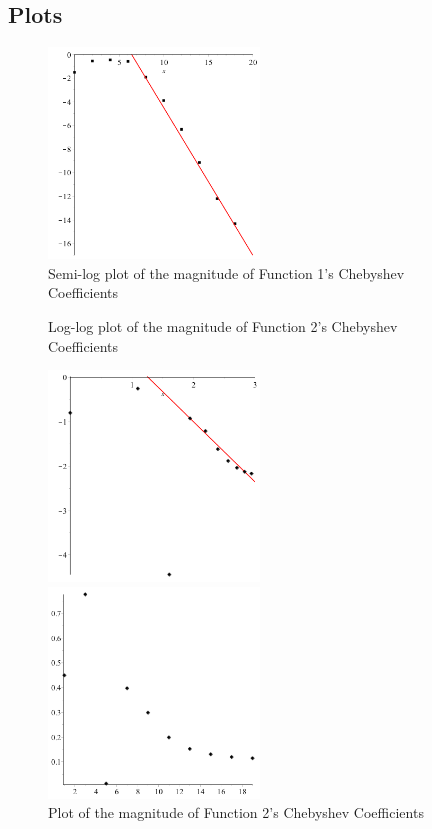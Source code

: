 \documentclass[11pt]{article} %
\begin{document}
{\subsection*{Plots}
\begin{figure}[H]
\caption*{Semi-log plot of the magnitude of Function 1's Chebyshev Coefficients}
\includegraphics[width=0.5\textwidth]{plots/problem6plot1.png}
\end{figure}
\begin{figure}[H]
\caption*{Log-log plot of the magnitude of Function 2's Chebyshev Coefficients}
\includegraphics[width=0.5\textwidth]{plots/problem6plot2.png}
\caption*{Plot of the magnitude of Function 2's Chebyshev Coefficients}
\includegraphics[width=0.5\textwidth]{plots/problem6plot2-2.png}

\end{figure}}
\end{document}
